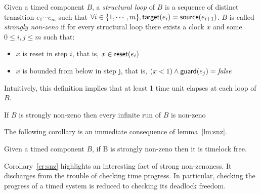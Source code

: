 \begin{definition}\label{def:snz}
  Given a timed component $B$, a \emph{structural loop} of $B$ is a sequence 
  of distinct transition $e_1\cdots e_m$ such that $\forall i\in\{1,\cdots,m
  \},\textsf{target}(e_i)= \textsf{source}(e_{i+1})$. $B$ is called \emph{strongly non-zeno} 
  if for every structural loop there exists a clock $x$ and some $0\le i,j
  \le m$ such that:
  \begin{itemize}
    \item $x$ is reset in step $i$, that is, $x\in\textsf{reset}(e_i)$
    \item $x$ is bounded from below in step j, that is, $(x<1)\wedge\textsf{guard}(e_j)
      =\textnormal{\textit{false}}$
  \end{itemize}
\end{definition}
Intuitively, this definition implies that at least 1 time unit elapses 
at each loop of $B$.

\begin{lemma}\label{lm:snz}
  If $B$ is strongly non-zeno then every infinite run of $B$ is non-zeno
\end{lemma}

The following corollary is an immediate consequence of lemma~\ref{lm:snz}. 
\begin{corollary}\label{cr:snz}
Given a timed component $B$, if B is strongly non-zeno then it is 
  timelock free.
\end{corollary}

Corollary~\ref{cr:snz} highlights an interesting fact of strong non-zenoness.
It discharges from the trouble of checking time progress. In particular, checking
the progress of a timed system is reduced to checking its deadlock freedom.

